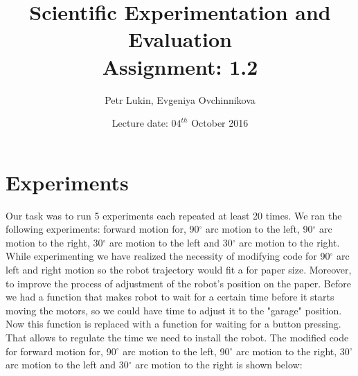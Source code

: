 \documentclass[a4paper, 12pt]{article}
\title{Scientific Experimentation and Evaluation  \\
				Assignment: 1.2}
\author{Petr Lukin, Evgeniya Ovchinnikova}
\date{Lecture date: $04^{th}$ October 2016}
\begin{document}
\maketitle

\section{Experiments}

Our task was to run 5 experiments each repeated at least 20 times. We ran the following experiments: forward motion for, 90$^{\circ}$ arc motion to the left, 90$^{\circ}$ arc motion to the right, 30$^{\circ}$ arc motion to the left and 30$^{\circ}$ arc motion to the right.\\
While experimenting we have realized the necessity of modifying code for 90$^{\circ}$ arc left and right motion so the robot trajectory would fit a for paper size. Moreover, to improve the process of adjustment of the robot's position on the paper. Before we had a function that makes robot to wait for a certain time before it starts moving the motors, so we could have time to adjust it to the "garage" position. Now this function is replaced with a function for waiting for a button pressing. That allows to regulate the time we need to install the robot. The modified code for forward motion for, 90$^{\circ}$ arc motion to the left, 90$^{\circ}$ arc motion to the right, 30$^{\circ}$ arc motion to the left and 30$^{\circ}$ arc motion to the right is shown below:
\end{document}
